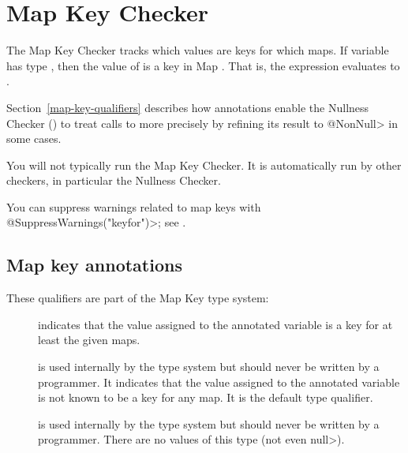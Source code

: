 \htmlhr
\chapter{Map Key Checker\label{map-key-checker}}

The Map Key Checker tracks which values are keys for which maps.  If variable
 has type , then the value of  is a key
in Map .  That is, the expression  evaluates to
.

Section~\ref{map-key-qualifiers} describes how  annotations
enable the
Nullness Checker () to treat calls to
more precisely by refining its result to \<@NonNull> in some cases.

You will not typically run the Map Key Checker.  It is automatically run by
other checkers, in particular the Nullness Checker.

You can suppress warnings related to map keys with
\<@SuppressWarnings("keyfor")>; see .

\section{Map key annotations\label{map-key-annotations}}

These qualifiers are part of the Map Key type system:

\begin{description}

\item[]
  indicates that the value assigned to the annotated variable is a key for at
  least the given maps.

\item[]
  is used internally by the type system but should never be written by a
  programmer.  It indicates that the value assigned to the annotated
  variable is not known to be a key for any map.  It is the default type
  qualifier.

\item[]
  is used internally by the type system but should never be written by a
  programmer.  There are no values of this type (not even \<null>).

\end{description}

